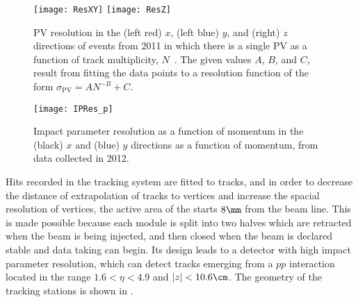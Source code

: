 \begin{figure}
  \begin{center}
    \texttt{[image: ResXY]}
    \texttt{[image: ResZ]}
    \caption[PV resolution as a function of track multiplicity]{
      PV resolution in the (left red) $x$, (left blue) $y$, and (right) $z$ directions
      of events from 2011 in which there is a single PV as a function of track multiplicity,
      $N$~\protect\cite{LHCb-CP-2014-001}.
      The given values $A$, $B$, and $C$, result from fitting the data points to a resolution
      function of the form $\sigma_\mathrm{PV} = AN^{-B} + C$.
    }
    \label{fig:velo:pvres}
  \end{center}
\end{figure}

  

\begin{figure}
  \begin{center}
    \texttt{[image: IPRes\_p]}
    \caption[IP resolution as a function of momentum]{
      Impact parameter resolution as a function of momentum in the (black) $x$ and (blue) $y$
      directions as a function of momentum, from data collected in 2012.
    }
    \label{fig:velo:ipres}
  \end{center}
\end{figure}

Hits recorded in the tracking system are fitted to tracks, and in order to decrease the
distance of extrapolation of tracks to vertices and increase the spacial resolution of vertices,
the active area of the \velo starts $8\mm$ from the beam line.
This is made possible because each module is split into two halves which are retracted when the
\lhc beam is being injected, and then closed when the beam is declared stable and data taking can
begin.
Its design leads to a detector with high impact parameter resolution, which can detect tracks
emerging from a $pp$ interaction located in the range $1.6<\eta<4.9$ and $|z|<10.6\cm$.
The geometry of the tracking stations is shown in .







